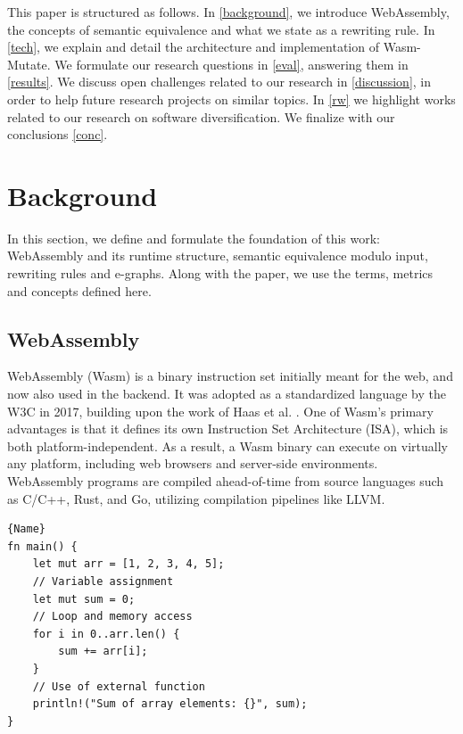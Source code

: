 \documentclass[sigplan,screen]{acmart}
\newcommand{\tool}{{\sc Wasm-Mutate}\xspace}
\begin{document}
This paper is structured as follows. 
In \autoref{background}, we introduce WebAssembly, the concepts of semantic equivalence and what we state as a rewriting rule.
In \autoref{tech}, we explain and detail the architecture and implementation of \tool.
We formulate our research questions in \autoref{eval}, answering them in \autoref{results}.
We discuss open challenges related to our research in \autoref{discussion}, in order to help future research projects on similar topics.
In \autoref{rw} we highlight works related to our research on software diversification.
We finalize with our conclusions \autoref{conc}.

\section{Background}
\label{background}

In this section, we define and formulate the foundation of this work: WebAssembly and its runtime structure, semantic equivalence modulo input, rewriting rules and e-graphs.
Along with the paper, we use the terms, metrics and concepts defined here.

\subsection{WebAssembly}

WebAssembly (Wasm) is a binary instruction set initially  meant for the web, and now also used in the backend. 
It was adopted as a standardized language by the W3C in 2017, building upon the work of Haas et al. \cite{haas2017bringing}. One of Wasm's primary advantages is that it defines its own Instruction Set Architecture (ISA), which is both platform-independent. As a result, a Wasm binary can execute on virtually any platform, including web browsers and server-side environments. 
WebAssembly programs are compiled ahead-of-time from source languages such as C/C++, Rust, and Go, utilizing compilation pipelines like LLVM. 

{\captionsetup{width=0.8\linewidth}
\begin{lstlisting}[label=example:cprogram,caption={Rust program containing function declaration, loop, conditional and memory access.},captionpos=b]{Name}
fn main() {
    let mut arr = [1, 2, 3, 4, 5];
    // Variable assignment
    let mut sum = 0;
    // Loop and memory access
    for i in 0..arr.len() {
        sum += arr[i];
    }
    // Use of external function
    println!("Sum of array elements: {}", sum);
}
\end{lstlisting}   
}
\end{document}
